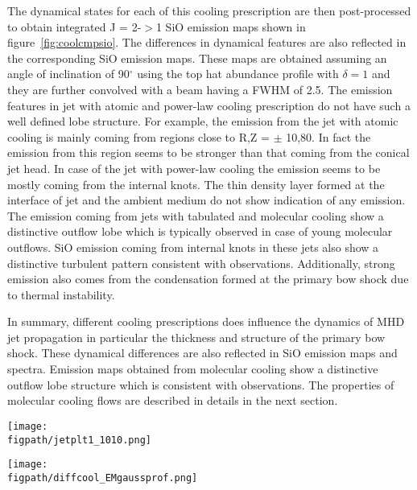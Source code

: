 \documentclass[useAMS,usenatbib,letters]{mn2e}
\newcommand{\figpath}{PFIGS/}
\begin{document}
The dynamical states for each of this cooling prescription are then 
post-processed to obtain integrated J = 2-$>$1 SiO emission
maps shown in figure~\ref{fig:coolcmpsio}. The differences in dynamical
features are also reflected in the corresponding SiO emission
maps. These maps are obtained assuming an angle of inclination of
90$^\circ$ using the top hat abundance
profile with $\delta = 1$ and they are further convolved with a beam
having a FWHM of 2.5\arcsec. The
emission features in jet with atomic and power-law cooling prescription do not have
such a well defined lobe structure. For example, the emission from the jet with atomic
cooling is mainly coming from regions close to R,Z = $\pm$
10,80. In fact the emission from this region seems to be stronger than
that coming from the conical jet head. In case of the jet with
power-law cooling the emission seems to be mostly coming from the
internal knots. The thin density layer formed at the interface of jet
and the ambient medium do not show indication of any emission. 
The emission coming from jets with
tabulated and molecular cooling show a distinctive outflow lobe which
is typically observed in case of young molecular outflows.
SiO emission coming from internal knots in these jets also show a
distinctive turbulent pattern consistent with
observations. Additionally, strong emission also comes from the
condensation formed at the primary bow shock due to thermal
instability. 
%

In summary, different cooling prescriptions does influence the
dynamics of MHD jet propagation in particular the thickness and
structure of the primary bow shock. These dynamical differences are
also reflected in SiO emission maps and spectra. Emission maps
obtained from molecular cooling show a distinctive outflow lobe
structure which is consistent with observations. The properties of 
molecular cooling flows are described in details in the next section.


 

\begin{figure*}
 \texttt{[image: \\figpath/jetplt1\_1010.png]}
 \caption{Jet Volume Density for different cooling modes with
   $\eta$ = 10 and $\beta$ = 10.}
\label{fig:coolcmpdyn}
\end{figure*}

\begin{figure*}
 \texttt{[image: \\figpath/diffcool\_EMgaussprof.png]}
 \caption{A plot of the integrated SiO J2-1 emission from 5 models, 
each using a different method to calculate cooling and all with $\eta$=10 $\beta$=10.}
\label{fig:coolcmpsio} 
\end{figure*}
\end{document}
